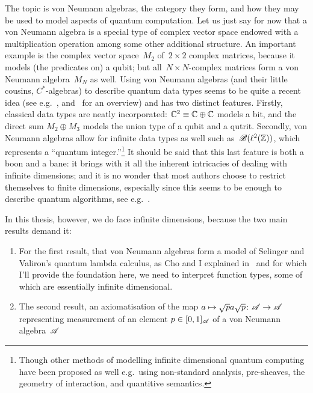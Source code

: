 \documentclass[b5paper]{book}
\begin{document}
\begin{parsec}
\begin{point}
The topic is von Neumann algebras,
the category they form,
and how they may be used
to model aspects of quantum computation.
Let us just say for now that a von Neumann algebra
is a special type of complex vector
space endowed with
a multiplication operation among some other additional structure.
An important example is the complex vector space~$M_2$
of~$2\times 2$ complex matrices,
because it models (the predicates on) a qubit;
but all~$N\times N$-complex matrices form a von Neumann algebra~$M_N$ as well.
Using von Neumann algebras
(and their little cousins, $C^*$-algebras) 
to describe quantum data types 
seems to be quite a recent idea
(see e.g.~\cite{jacobs2013block,rennela2015operator,furber2013kleisli}, 
	and~\cite{cho2016semantics} for an overview)
and has two distinct features.
Firstly, classical data types
are neatly incorporated:
$\mathbb{C}^2 \equiv \mathbb{C}\oplus \mathbb{C}$
models a bit,
and the direct sum $M_2\oplus M_3$
models the union type of a qubit and a qutrit.
Secondly,
von Neumann algebras
allow for infinite data types as well
	such as~$\mathscr{B}(\ell^2(\mathbb{Z}))$,
which represents a ``quantum integer.''\footnote{Though
	other methods of modelling infinite dimensional
	quantum computing have been proposed as well
	e.g.~using non-standard analysis\cite{Gogioso2017},
	pre-sheaves\cite{malherbe2013categorical},
	the geometry of interaction\cite{hasuo2017semantics},
	and quantitive semantics\cite{pagani2014applying}.}
It should be said that this last feature
is both a boon and a bane:
it brings with it all the inherent
intricacies of dealing with infinite dimensions;
and it is no wonder that
most authors choose 
to restrict themselves
to finite dimensions,
especially since
this seems to be enough to describe quantum algorithms,
see e.g.~\cite{nielsen2002quantum}.
\end{point}
\begin{point}%
In this thesis, however,
we do face infinite dimensions,
because the two main results demand it:
\begin{enumerate}
\item
For the first result,
that von Neumann algebras
form  a model of Selinger and Valiron's quantum lambda calculus,
		as Cho and I explained in~\cite{model}
and for which I'll provide the foundation here,
we need to interpret function types,
some of which are essentially infinite dimensional.
\item
The second result,
an axiomatisation
of the map $a\mapsto \sqrt{p}a\sqrt{p}\colon \mathscr{A}\to\mathscr{A}$
representing measurement
of an element $p\in[0,1]_{\mathscr{A}}$
of a von Neumann algebra~$\mathscr{A}$

\end{enumerate}
\end{point}
\end{parsec}
\end{document}
